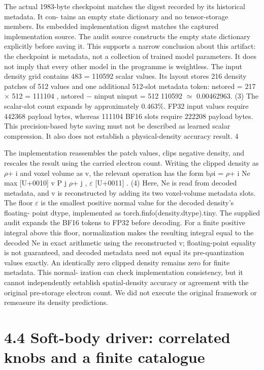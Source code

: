 \documentclass[11pt]{article}
\begin{document}
The actual 1983-byte checkpoint matches the digest recorded by its historical metadata. It con-
tains an empty state dictionary and no tensor-storage members. Its embedded implementation
digest matches the captured implementation source. The audit source constructs the empty state
dictionary explicitly before saving it. This supports a narrow conclusion about this artifact: the
checkpoint is metadata, not a collection of trained model parameters. It does not imply that every
other model in the programme is weightless.
The input density grid contains 483 = 110592 scalar values. Its layout stores 216 density patches
of 512 values and one additional 512-slot metadata token:
nstored = 217 \ensuremath{\times} 512 = 111104 , nstored \ensuremath{-} ninput
ninput
= 512
110592 \ensuremath{\simeq} 0.00462963. (3)
The scalar-slot count expands by approximately 0.463\%. FP32 input values require 442368 payload
bytes, whereas 111104 BF16 slots require 222208 payload bytes. This precision-based byte saving
must not be described as learned scalar compression. It also does not establish a physical-density
accuracy result.
4

The implementation reassembles the patch values, clips negative density, and rescales the result
using the carried electron count. Writing the clipped density as \ensuremath{\rho}+
i and voxel volume as v, the
relevant operation has the form
b\ensuremath{\rho}i = \ensuremath{\rho}+
i
Ne
max
[U+0010]
v P
j \ensuremath{\rho}+
j , \ensuremath{\varepsilon}
[U+0011] . (4)
Here, Ne is read from decoded metadata, and v is reconstructed by adding its two voxel-volume
metadata slots. The floor \ensuremath{\varepsilon} is the smallest positive normal value for the decoded density’s floating-
point dtype, implemented as torch.finfo(density.dtype).tiny. The supplied audit expands the
BF16 tokens to FP32 before decoding. For a finite positive integral above this floor, normalization
makes the resulting integral equal to the decoded Ne in exact arithmetic using the reconstructed v;
floating-point equality is not guaranteed, and decoded metadata need not equal its pre-quantization
values exactly. An identically zero clipped density remains zero for finite metadata. This normal-
ization can check implementation consistency, but it cannot independently establish spatial-density
accuracy or agreement with the original pre-storage electron count. We did not execute the original
framework or remeasure its density predictions.

\section*{4.4 Soft-body driver: correlated knobs and a finite catalogue}
\end{document}
